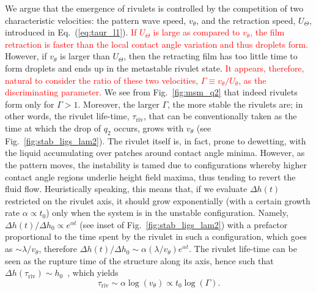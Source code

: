 \documentclass[twocolumn,amsmath,amssymb,showpacs,prl,superscriptaddress]{revtex4-1} %
\newcommand{\REV}[1]{\textcolor{red}{#1}}
\begin{document}
We argue that the emergence of rivulets is controlled by the competition of two characteristic velocities: the pattern wave speed, $v_{\theta}$, and the retraction speed, $U_{\Theta}$, introduced in Eq.~(\ref{eq:taur_l1}). 
\REV{If $U_{\Theta}$ is large as compared to $v_{\theta}$, the film retraction is faster than 
the local contact angle variation and thus droplets form.}
However, if $v_{\theta}$ is larger than $U_{\Theta}$, then the retracting film has too little time to form droplets and ends up in the metastable rivulet state. \REV{It appears, therefore, natural to consider the ratio of these two velocities, 
$\Gamma \equiv v_{\theta}/U_{\theta}$, as the discriminating parameter.}
We see from Fig.~\ref{fig:msm_q2} that indeed rivulets form only for $\Gamma > 1$. 
Moreover, the larger $\Gamma$, the more stable the rivulets are; in other words, the rivulet life-time, $\tau_{\text{riv}}$, that can be conventionally taken as the time at which the drop of $q_2$ occurs, grows with $v_{\theta}$ (see Fig.~\ref{fig:stab_ligs_lam2}).
The rivulet itself is, in fact, prone to dewetting, with the liquid accumulating over patches around contact angle minima. However, as the pattern moves, the instability is tamed due to configurations whereby higher contact angle regions underlie height field maxima, thus tending to revert the fluid flow.
Heuristically speaking, this means that, if we evaluate $\Delta h(t)$ restricted on the rivulet axis, it should grow exponentially (with a certain growth rate $\alpha \propto t_0$) only when the system is in the unstable configuration. Namely, $\Delta h(t)/\Delta h_0 \propto e^{\alpha t}$ (see inset of Fig.~\ref{fig:stab_ligs_lam2}) with a prefactor proportional to the time spent by the rivulet in such a configuration, which goes as $\sim \lambda/v_{\theta}$, therefore 
$\Delta h(t)/\Delta h_0 \sim \alpha (\lambda/v_{\theta})e^{\alpha t}$. 
The rivulet life-time can be seen as the rupture time of the structure along its axis, hence such that $\Delta h (\tau_{\text{riv}}) \sim h_0$~\cite{PhysRevE.104.034801}, which yields
\begin{equation}\label{eq:rivlt}
    \tau_{\text{riv}} \sim \alpha \log(v_{\theta}) \propto t_0 \log(\Gamma). 
\end{equation}
\end{document}
